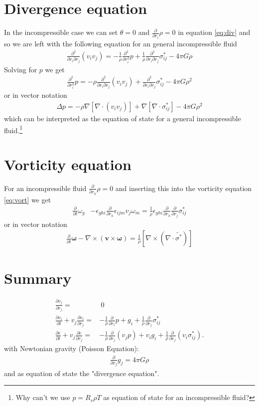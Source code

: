 \documentclass[a4paper,
					fontsize=12pt,
					twoside,
					pagesize,
					cleardoublepage=plain,
					headsepline,
					bibliography=totoc
					]{scrbook}
\renewcommand{\vec}[1]{\boldsymbol{#1}}
\newcommand{\lrb}[1]{{ \left[ #1 \right] }}
\newcommand{\pd}[1]{\frac{\partial}{\partial #1}}
\newcommand{\ppd}[2]{\frac{\partial #2}{\partial #1}}
\newcommand{\pdd}[1]{\frac{\partial^2}{\partial #1^2}}
\begin{document}
\section{Divergence equation}
In the incompressible case we can set $\theta=0$ and $\pd{r_i}\rho=0$ in
equation \eqref{eq:div} and so we are left with the following equation for an
general incompressible fluid
\begin{align}
\frac{\partial^2}{\partial r_i \partial r_j}(v_i v_j) = 
-\frac{1}{\rho}\pdd{r_i}p 
+\frac{1}{\rho}\frac{\partial^2}{\partial r_i \partial r_j}\sigma^*_{ij} 
- 4\pi G \rho
\end{align}
Solving for $p$ we get
\begin{align}
\pdd{r_i}p= 
-\rho \frac{\partial^2}{\partial r_i \partial r_j}(v_i v_j)
+\frac{\partial^2}{\partial r_i \partial r_j}\sigma^*_{ij} 
-4\pi G \rho^2
\end{align}
or in vector notation
\begin{align}
\Delta p = 
-\rho \nabla\lrb{\nabla\cdot(v_i v_j)} 
+\nabla\lrb{\nabla\cdot \sigma^*_{ij}}
- 4\pi G \rho^2
\end{align}
which can be interpreted as the equation of state for a general
incompressible fluid.\footnote{Why can't we use $p=R_s \rho T$ as equation of
state for an incompressible fluid?} 

\section{Vorticity equation}
For an incompressible fluid $\pd{r_h}\rho = 0$ and inserting this into
the vorticity equation \eqref{eq:vort} we get
\begin{align}
\pd{t}\omega_g
&-\epsilon_{ghi}\pd{r_h} \epsilon_{ijm} v_j \omega_m =
\frac{1}{\rho}\epsilon_{ghi}\pd{r_h}\pd{r_j}\sigma^*_{ij}
\end{align}
or in vector notation
\begin{align}
\pd{t} \vec{\omega}-\nabla \times (\vec{v} \times \vec{\omega}) = 
\frac{1}{\rho} \lrb{\nabla \times (\nabla \cdot \tilde{\sigma^*})}
\end{align}

\section{Summary}
\begin{align}
\ppd{r_j}{v_j} =&\ 0 \label{eq:icmass}\\
\ppd{t}{v_i} + v_j \ppd{r_j}{v_i} =& -\frac{1}{\rho}\pd{r_i}p + g_i
+\frac{1}{\rho}\pd{r_j}\sigma^*_{ij}\label{eq:icmom}\\
\ppd{t}{e} + v_j \ppd{r_j}{e} =& -\frac{1}{\rho} \pd{r_j}(v_j p) + v_i g_i
+\frac{1}{\rho}\pd{r_j}(v_i \sigma^*_{ij}).\label{eq:icetot}
\end{align}
with Newtonian gravity (Poisson Equation):
\begin{align}
\pd{r_j}g_j=4\pi G \rho
\end{align}
and as equation of state the "divergence equation".
\end{document}
